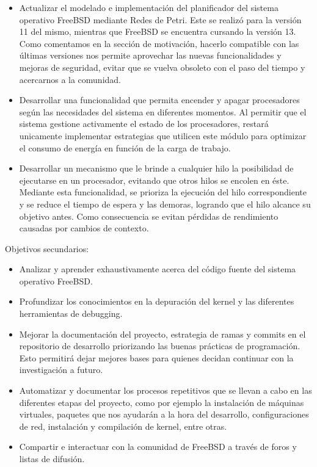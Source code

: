 \begin{itemize}
    \item Actualizar el modelado e implementación del planificador del sistema operativo FreeBSD mediante Redes de Petri. Este se realizó para la versión 11 del mismo, mientras que FreeBSD se encuentra cursando la versión 13. Como comentamos en la sección de motivación, hacerlo compatible con las últimas versiones nos permite aprovechar las nuevas funcionalidades y mejoras de seguridad, evitar que se vuelva obsoleto con el paso del tiempo y acercarnos a la comunidad.
    \item Desarrollar una funcionalidad que permita encender y apagar procesadores según las necesidades del sistema en diferentes momentos. Al permitir que el sistema gestione activamente el estado de los procesadores, restará unicamente implementar estrategias que utilicen este módulo para optimizar el consumo de energía en función de la carga de trabajo.
    \item Desarrollar un mecanismo que le brinde a cualquier hilo la posibilidad de ejecutarse en un procesador, evitando que otros hilos se encolen en éste. Mediante esta funcionalidad, se prioriza la ejecución del hilo correspondiente y se reduce el tiempo de espera y las demoras, logrando que el hilo alcance su objetivo antes. Como consecuencia se evitan pérdidas de rendimiento causadas por cambios de contexto.
\end{itemize}

Objetivos secundarios:

\begin{itemize}
    \item Analizar y aprender exhaustivamente acerca del código fuente del sistema operativo FreeBSD.\@
    \item Profundizar los conocimientos en la depuración del kernel y las diferentes herramientas de debugging.
    \item Mejorar la documentación del proyecto, estrategia de ramas y commits en el repositorio de desarrollo priorizando las buenas prácticas de programación. Esto permitirá dejar mejores bases para quienes decidan continuar con la investigación a futuro.
    \item Automatizar y documentar los procesos repetitivos que se llevan a cabo en las diferentes etapas del proyecto, como por ejemplo la instalación de máquinas virtuales, paquetes que nos ayudarán a la hora del desarrollo, configuraciones de red, instalación y compilación de kernel, entre otras.
    \item Compartir e interactuar con la comunidad de FreeBSD a través de foros y listas de difusión.
\end{itemize}


